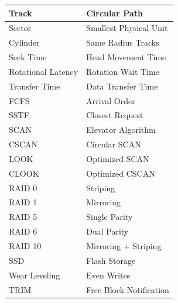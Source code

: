 \begin{center}
\begin{tabular}{|p{5cm}|p{8cm}|}
\hline
Track & Circular Path \\
\hline
Sector & Smallest Physical Unit \\
\hline
Cylinder & Same Radius Tracks \\
\hline
Seek Time & Head Movement Time \\
\hline
Rotational Latency & Rotation Wait Time \\
\hline
Transfer Time & Data Transfer Time \\
\hline
FCFS & Arrival Order \\
\hline
SSTF & Closest Request \\
\hline
SCAN & Elevator Algorithm \\
\hline
CSCAN & Circular SCAN \\
\hline
LOOK & Optimized SCAN \\
\hline
CLOOK & Optimized CSCAN \\
\hline
RAID 0 & Striping \\
\hline
RAID 1 & Mirroring \\
\hline
RAID 5 & Single Parity \\
\hline
RAID 6 & Dual Parity \\
\hline
RAID 10 & Mirroring + Striping \\
\hline
SSD & Flash Storage \\
\hline
Wear Leveling & Even Writes \\
\hline
TRIM & Free Block Notification \\
\hline
\end{tabular}
\end{center}